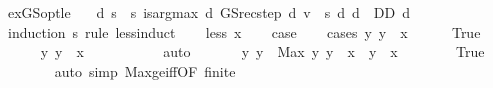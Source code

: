 \begin{isabellebody}
\isamarkupfalse%
\ ex{\isacharunderscore}{\kern0pt}GS{\isacharunderscore}{\kern0pt}opt{\isacharunderscore}{\kern0pt}le{\isacharcolon}{\kern0pt}\isanewline
\ \ \ {\isachardoublequoteopen}{\isasymexists}d{\isachardot}{\kern0pt}\ {\isacharparenleft}{\kern0pt}{\isasymforall}s{\isacharprime}{\kern0pt}\ {\isasymle}\ s{\isachardot}{\kern0pt}\ is{\isacharunderscore}{\kern0pt}arg{\isacharunderscore}{\kern0pt}max\ {\isacharparenleft}{\kern0pt}{\isasymlambda}d{\isachardot}{\kern0pt}\ GS{\isacharunderscore}{\kern0pt}rec{\isacharunderscore}{\kern0pt}step\ d\ v\ {\isachardollar}{\kern0pt}\ s{\isacharprime}{\kern0pt}{\isacharparenright}{\kern0pt}\ {\isacharparenleft}{\kern0pt}{\isasymlambda}d{\isachardot}{\kern0pt}\ d\ {\isasymin}\ D\isactrlsub D{\isacharparenright}{\kern0pt}\ d{\isacharparenright}{\kern0pt}{\isachardoublequoteclose}\isanewline
%
\isadelimproof
%
\endisadelimproof
%
\isatagproof
{}\isamarkupfalse%
\ {\isacharparenleft}{\kern0pt}induction\ s\ rule{\isacharcolon}{\kern0pt}\ less{\isacharunderscore}{\kern0pt}induct{\isacharparenright}{\kern0pt}\isanewline
\ \ \isamarkupfalse%
\ {\isacharparenleft}{\kern0pt}less\ x{\isacharparenright}{\kern0pt}\isanewline
\ \ \isamarkupfalse%
\ {\isacharquery}{\kern0pt}case\isanewline
\ \ \isamarkupfalse%
\ {\isacharparenleft}{\kern0pt}cases\ {\isachardoublequoteopen}{\isasymexists}y{\isachardot}{\kern0pt}\ y\ {\isacharless}{\kern0pt}\ x{\isachardoublequoteclose}{\isacharparenright}{\kern0pt}\isanewline
\ \ \ \ \isamarkupfalse%
\ True\isanewline
\ \ \ \ \isamarkupfalse%
\ {\isachardoublequoteopen}{\isacharbraceleft}{\kern0pt}y{\isachardot}{\kern0pt}\ y\ {\isacharless}{\kern0pt}\ x{\isacharbraceright}{\kern0pt}\ {\isasymnoteq}\ {\isacharbraceleft}{\kern0pt}{\isacharbraceright}{\kern0pt}{\isachardoublequoteclose}\ \isanewline
\ \ \ \ \ \ \isamarkupfalse%
\ auto\isanewline
\ \ \ \ \isamarkupfalse%
\ {}{\isacharcolon}{\kern0pt}\ {\isachardoublequoteopen}{\isasymAnd}y{\isachardot}{\kern0pt}\ y\ {\isasymle}\ Max\ {\isacharbraceleft}{\kern0pt}y{\isachardot}{\kern0pt}\ y\ {\isacharless}{\kern0pt}\ x{\isacharbraceright}{\kern0pt}\ {\isasymlongleftrightarrow}\ y\ {\isacharless}{\kern0pt}\ x{\isachardoublequoteclose}\isanewline
\ \ \ \ \ \ \isamarkupfalse%
\ True\isanewline
\ \ \ \ \ \ \isamarkupfalse%
\ {\isacharparenleft}{\kern0pt}auto\ simp{\isacharcolon}{\kern0pt}\ Max{\isacharunderscore}{\kern0pt}ge{\isacharunderscore}{\kern0pt}iff{\isacharbrackleft}{\kern0pt}OF\ finite{\isacharbrackright}{\kern0pt}{\isacharparenright}{\kern0pt}\isanewline

\end{isabellebody}

